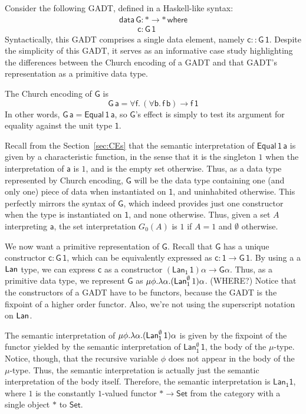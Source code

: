 \documentclass[acmsmall,screen,review,anonymous]{acmart}
\theoremstyle{definition}
\newcommand{\set}{\mathsf{Set}}
\begin{document}
\begin{example}\label{ex:g1}
Consider the following GADT, defined in a Haskell-like syntax:
\begin{equation}\label{eq:example-GADT}
\begin{array}{l}
\mathsf{data\,G : * \to *\,where}\\
\mathsf{\;\;\;\;\;\;\;\;c : G\,1}
\end{array}
\end{equation}
Syntactically, this GADT comprises a single data element, namely
$\mathsf{c :: G \, 1}$. Despite the simplicity of this GADT, it serves
as an informative case study highlighting the differences between the
Church encoding of a GADT and that GADT's representation as a
primitive data type.

The Church encoding of $\mathsf{G}$ is
\[\mathsf{G\,a} = \mathsf{\forall f.\, (\forall b.\,
  f\,b) \to f\,1} \] In other words, $\mathsf{G\,a =
  \mathsf{Equal}\,1\,a}$, so $\mathsf{G}$'s effect is simply to test
its argument for equality against the unit type $\mathsf{1}$.

Recall from the Section~\ref{sec:CEs} that the semantic interpretation
of $\mathsf{Equal\,1\,a}$ is given by a characteristic function, in
the sense that it is the singleton $1$ when the interpretation of
$\mathsf{a}$ is $1$, and is the empty set otherwise.  Thus, as a data
type represented by Church encoding, $\mathsf{G}$ will be the data
type containing one (and only one) piece of data when instantiated on
$\mathsf{1}$, and uninhabited otherwise.  This perfectly mirrors the
syntax of $\mathsf{G}$, which indeed provides just one constructor
when the type is instantiated on $\mathsf{1}$, and none otherwise.
Thus, given a set $A$ interpreting $\mathsf{a}$, the set
interpretation $G_0(A)$ is $1$ if $A = 1$ and $\emptyset$ otherwise.

We now want a primitive representation of $\mathsf{G}$.  Recall that
$\mathsf{G}$ has a unique constructor $\mathsf{c : G\,1}$, which can
be equivalently expressed as $\mathsf{c: 1 \to G\,1}$.  By using a
a$\mathsf{Lan}$ type, we can express $\mathsf{c}$ as a constructor
$\mathsf{(Lan_1\, 1)\alpha \to G \alpha}$.  Thus, as a primitive data
type, we represent $\mathsf{G}$ as $\mu \phi. \lambda
\alpha. (\mathsf{Lan}^{\emptyset}_1 \,1)\alpha$.  {\color{blue} (WHERE?)
  Notice that the constructors of a GADT have to be functors, because
  the GADT is the fixpoint of a higher order functor. Also, we're not
  using the superscript notation on $\mathsf{Lan}$.}

The semantic interpretation of $\mathsf{\mu \phi. \lambda
  \alpha. (\mathsf{Lan}^{\emptyset}_1\, 1)\alpha}$ is given by the fixpoint of
the functor yielded by the semantic interpretation of
$\mathsf{Lan^{\emptyset}_1\, 1}$, the body of the $\mathsf{\mu}$-type.
Notice, though, that the recursive variable $\mathsf{\phi}$ does not
appear in the body of the $\mathsf{\mu}$-type.  Thus, the semantic
interpretation is actually just the semantic interpretation of the
body itself.  Therefore, the semantic interpretation is
$\mathsf{Lan_1 1}$, where $1$ is the constantly $1$-valued functor
$\ast \to \set$ from the category with a single object $\ast$ to
$\set$.


\end{example}
\end{document}
